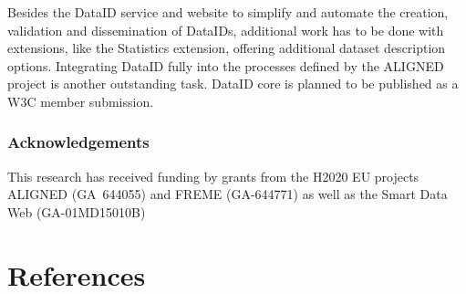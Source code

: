\documentclass[runningheads,a4paper]{llncs}
\newcommand{\dmp}{{\scshape dmp}\xspace}
\begin{document}

Besides the DataID service and website to simplify and automate the creation, validation and dissemination of DataIDs, additional work has to be done with extensions, like the Statistics extension, offering additional dataset description options. Integrating DataID fully into the processes defined by the ALIGNED project is another outstanding task.
DataID core is planned to be published as a W3C member submission.
\subsubsection{Acknowledgements}
This research has received funding by grants from the H2020 EU projects ALIGNED (GA~644055) and FREME (GA-644771) as well as the Smart Data Web (GA-01MD15010B)

\section{References}
\printbibliography[heading=none, title=References]
\end{document}
